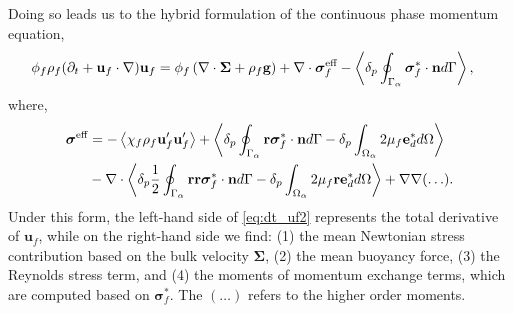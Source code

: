 Doing so leads us to the hybrid formulation of the continuous phase momentum  equation, %
\begin{align}
    \phi_f \rho_f(\pddt + \textbf{u}_f  \cdot \grad) \textbf{u}_f
    &= \phi_f 
    \left(\div \bm{\Sigma}
    + \rho_f \textbf{g}\right)
    + \div \bm\sigma_f^{\text{eff}}
    - \pSavg{\bm\sigma_f^{*}\cdot \textbf{n}}, 
    \label{eq:dt_uf2}
\end{align}
where,
\begin{align}
    \bm{\sigma}^{\text{eff}} 
    &= 
    - \avg{\chi_f\rho_f \textbf{u}_f'\textbf{u}_f'} 
    + \pavg{\intS{\textbf{r}\bm\sigma^{*}_f\cdot \textbf{n}} - \delta_p\intO{2\mu_f\textbf{e}_d^*}}\nonumber\\
    &- \div
        \pavg{ \frac{1}{2}\intS{\textbf{rr}\bm\sigma^{*}_f\cdot \textbf{n}}
        - \delta_p\intO{2\mu_f \textbf{r} \textbf{e}_d^*}}
        + \grad\grad (\ldots). 
    \label{eq:def_sigma_eff_f2}
\end{align}
Under this form, the left-hand side of \ref{eq:dt_uf2} represents the total derivative of $\textbf{u}_f$, while on the right-hand side we find: (1) the mean Newtonian stress contribution based on the bulk velocity $\bm\Sigma$, (2) the mean buoyancy force, (3) the Reynolds stress term, and (4) the moments of momentum exchange terms, which are computed based on $\bm\sigma_f^*$.
The $(\ldots)$ refers to the higher order moments. 

